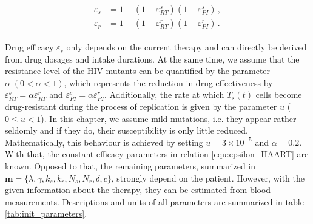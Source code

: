 \begin{align}
    \begin{split}
        \varepsilon_s &= 1 - (1-\varepsilon_{RT}^s)(1-\varepsilon_{PI}^s)\, ,\\
        \varepsilon_r &= 1 - (1-\varepsilon_{RT}^r)(1-\varepsilon_{PI}^r) \,\text{.}
    \end{split}
    \label{equ:epsilon_HAART}
\end{align}

Drug efficacy $\varepsilon_s$ only depends on the current therapy and can directly be derived from drug dosages and intake durations.
At the same time, we assume that the resistance level of the HIV mutants can be quantified by the parameter $\alpha\; (0 < \alpha < 1)$, 
which represents the reduction in drug effectiveness by $\varepsilon_{RT}^s = \alpha \varepsilon_{RT}^r$ and $\varepsilon_{PI}^s = \alpha \varepsilon_{PI}^r$.
Additionally, the rate at which $T_s(t)$ cells become drug-resistant during the process of replication is given by the parameter $u$ ($0 \leq u < 1$).
In this chapter, we assume mild mutations, i.e. they appear rather seldomly and if they do, their susceptibility is only little reduced.
Mathematically, this behaviour is achieved by setting $u = 3 \times 10^{-5}$ and $\alpha = 0.2$.
With that, the constant efficacy parameters in relation \ref{equ:epsilon_HAART} are known.\newline
Opposed to that, the remaining parameters, summarized in $\mathbf{m} = \{\lambda, \gamma, k_s, k_r, N_s, N_r, \delta, c\}$, strongly depend on the patient.
However, with the given information about the therapy, they can be estimated from blood measurements.
Descriptions and units of all parameters are summarized in table \ref{tab:init_parameters}.\par

